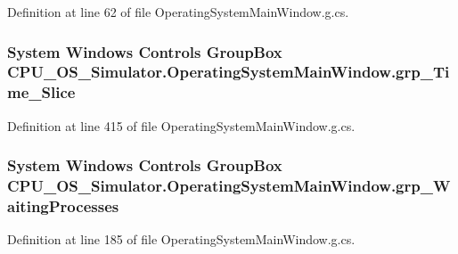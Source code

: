 Definition at line 62 of file Operating\+System\+Main\+Window.\+g.\+cs.

\hypertarget{class_c_p_u___o_s___simulator_1_1_operating_system_main_window_a09854a80dc1796d59c66a12415e64c8c}{}
\subsubsection[{grp\+\_\+\+Time\+\_\+\+Slice}]{\setlength{\rightskip}{0pt plus 5cm}System Windows Controls Group\+Box C\+P\+U\+\_\+\+O\+S\+\_\+\+Simulator.\+Operating\+System\+Main\+Window.\+grp\+\_\+\+Time\+\_\+\+Slice\hspace{0.3cm}{\ttfamily [package]}}\label{class_c_p_u___o_s___simulator_1_1_operating_system_main_window_a09854a80dc1796d59c66a12415e64c8c}


Definition at line 415 of file Operating\+System\+Main\+Window.\+g.\+cs.

\hypertarget{class_c_p_u___o_s___simulator_1_1_operating_system_main_window_ae3e3b5c1c34bc0caa4f44e02e5cbd81c}{}
\subsubsection[{grp\+\_\+\+Waiting\+Processes}]{\setlength{\rightskip}{0pt plus 5cm}System Windows Controls Group\+Box C\+P\+U\+\_\+\+O\+S\+\_\+\+Simulator.\+Operating\+System\+Main\+Window.\+grp\+\_\+\+Waiting\+Processes\hspace{0.3cm}{\ttfamily [package]}}\label{class_c_p_u___o_s___simulator_1_1_operating_system_main_window_ae3e3b5c1c34bc0caa4f44e02e5cbd81c}


Definition at line 185 of file Operating\+System\+Main\+Window.\+g.\+cs.

